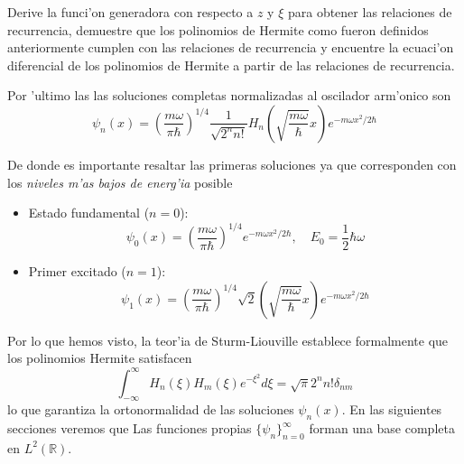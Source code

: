 \documentclass[main.tex]{subfiles}
\begin{document}
\exe  Derive la funci'on generadora con respecto a $z$ y $\xi$ para obtener las relaciones de recurrencia, demuestre que los polinomios de Hermite como fueron definidos anteriormente cumplen con las relaciones de recurrencia y encuentre la ecuaci'on diferencial de los polinomios de Hermite a partir de las relaciones de recurrencia.

Por 'ultimo las las soluciones completas normalizadas al oscilador arm'onico son
\begin{equation}
\psi_n(x) = \left(\frac{m\omega}{\pi\hbar}\right)^{1/4}\frac{1}{\sqrt{2^n n!}}H_n\left(\sqrt{\frac{m\omega}{\hbar}}x\right)e^{-m\omega x^2/2\hbar}
\end{equation}

De donde es importante resaltar las primeras soluciones ya que corresponden con los \emph{niveles m'as bajos de energ'ia} posible

\begin{itemize}
\item Estado fundamental ($n=0$):
\begin{equation}
\psi_0(x) = \left(\frac{m\omega}{\pi\hbar}\right)^{1/4}e^{-m\omega x^2/2\hbar}, \quad E_0 = \frac{1}{2}\hbar\omega
\end{equation}

\item Primer excitado ($n=1$):
\begin{equation}
\psi_1(x) = \left(\frac{m\omega}{\pi\hbar}\right)^{1/4}\sqrt{2}\left(\sqrt{\frac{m\omega}{\hbar}}x\right)e^{-m\omega x^2/2\hbar}
\end{equation}
\end{itemize}

Por lo que hemos visto, la teor'ia de Sturm-Liouville establece formalmente que los polinomios Hermite satisfacen
\begin{equation}
\int_{-\infty}^\infty H_n(\xi)H_m(\xi)e^{-\xi^2}d\xi = \sqrt{\pi}2^n n! \delta_{nm}
\end{equation}
lo que garantiza la ortonormalidad de las soluciones $\psi_n(x)$.
En las siguientes secciones veremos que Las funciones propias $\{\psi_n\}_{n=0}^\infty$ forman una base completa en $L^2(\mathbb{R})$.
\end{document}
